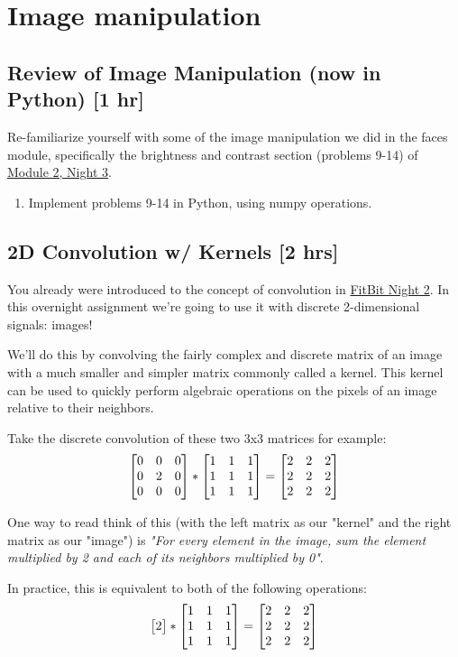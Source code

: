 \documentclass{tufte-handout}
\begin{document}
\section{Image manipulation}

\subsection{Review of Image Manipulation (now in Python) [1 hr]}

Re-familiarize yourself with some of the image manipulation we did in the faces module, specifically the brightness and contrast section (problems 9-14) of \href{https://drive.google.com/file/d/0B7LNBbaxYFujOHpEU2FDdkF6VEE/view
}{Module 2, Night 3}.

\begin{enumerate}[series=exercises, label=\textbf{Exercise} (\arabic*)]
    \item Implement problems 9-14 in Python, using numpy operations.
\end{enumerate}

\subsection{2D Convolution w/ Kernels [2 hrs]}

You already were introduced to the concept of convolution in \href{https://drive.google.com/file/d/1_eEtwNDHhF-Izfcf6l00PvG-b6whwety/view}{FitBit Night 2}. In this overnight assignment we're going to use it with discrete 2-dimensional signals: images!

We'll do this by convolving the fairly complex and discrete matrix of an image with a much smaller and simpler matrix commonly called a kernel. This kernel can be used to quickly perform algebraic operations on the pixels of an image relative to their neighbors.

Take the discrete convolution of these two 3x3 matrices for example:
\begin{align}
    \begin{bmatrix} 0 & 0 & 0 \\ 0 & 2 & 0 \\ 0 & 0 & 0 \end{bmatrix} * \begin{bmatrix} 1 & 1 & 1 \\ 1 & 1 & 1 \\ 1 & 1 & 1 \end{bmatrix} =
    \begin{bmatrix} 2 & 2 & 2 \\ 2 & 2 & 2 \\ 2 & 2 & 2 \end{bmatrix}
\end{align}

One way to read think of this (with the left matrix as our "kernel" and the right matrix as our "image") is \emph{"For every element in the image, sum the element multiplied by 2 and each of its neighbors multiplied by 0"}.

In practice, this is equivalent to both of the following operations:
\begin{align}\label{eqn:convolution1}
    \begin{bmatrix}2\end{bmatrix} * \begin{bmatrix} 1 & 1 & 1 \\ 1 & 1 & 1 \\ 1 & 1 & 1 \end{bmatrix} =
    \begin{bmatrix} 2 & 2 & 2 \\ 2 & 2 & 2 \\ 2 & 2 & 2 \end{bmatrix}
\end{align}
\end{document}
